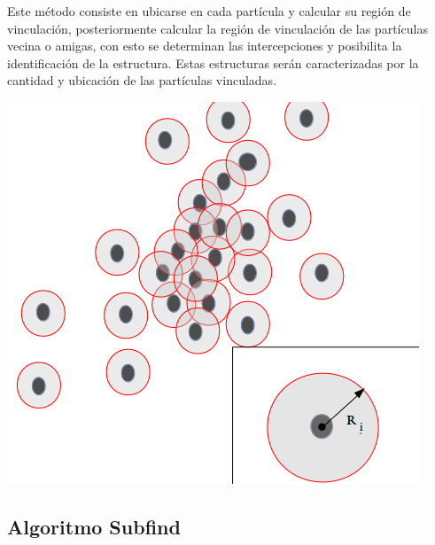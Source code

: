 Este método consiste en ubicarse en cada partícula y calcular su región de vinculación, posteriormente calcular la región de vinculación de las partículas vecina o amigas, con esto se determinan las intercepciones y posibilita la identificación de la estructura.
Estas estructuras serán caracterizadas por la cantidad y ubicación de las partículas vinculadas. 
%
\begin{center}
\includegraphics[scale=.35]{./figures/5_Algoritmo_Modelacion/FoF_metodo.png}
\label{fig: FoF esquema}
\end{center}
%

    \subsection{Algoritmo Subfind}
    \label{subsec: Algoritmo subfind}


